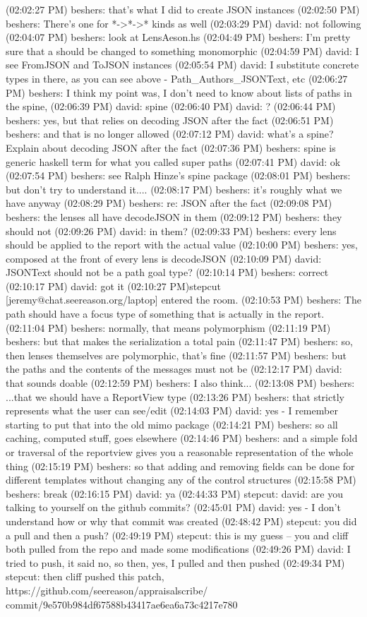 (02:02:27 PM) beshers: that's what I did to create JSON instances
(02:02:50 PM) beshers: There's one for *->*->* kinds as well
(02:03:29 PM) david: not following
(02:04:07 PM) beshers: look at LensAeson.hs
(02:04:49 PM) beshers: I'm pretty sure that a should be changed to something
monomorphic
(02:04:59 PM) david: I see FromJSON and ToJSON instances
(02:05:54 PM) david: I substitute concrete types in there, as you can see above
- Path_Authors_JSONText, etc
(02:06:27 PM) beshers: I think my point was, I don't need to know about lists
of paths in the spine,
(02:06:39 PM) david: spine
(02:06:40 PM) david: ?
(02:06:44 PM) beshers: yes, but that relies on decoding JSON after the fact
(02:06:51 PM) beshers: and that is no longer allowed
(02:07:12 PM) david: what's a spine? Explain about decoding JSON after the fact
(02:07:36 PM) beshers: spine is generic haskell term for what you called super
paths
(02:07:41 PM) david: ok
(02:07:54 PM) beshers: see Ralph Hinze's spine package
(02:08:01 PM) beshers: but don't try to understand it....
(02:08:17 PM) beshers: it's roughly what we have anyway
(02:08:29 PM) beshers: re: JSON after the fact
(02:09:08 PM) beshers: the lenses all have decodeJSON in them
(02:09:12 PM) beshers: they should not
(02:09:26 PM) david: in them?
(02:09:33 PM) beshers: every lens should be applied to the report with the
actual value
(02:10:00 PM) beshers: yes, composed at the front of every lens is decodeJSON
(02:10:09 PM) david: JSONText should not be a path goal type?
(02:10:14 PM) beshers: correct
(02:10:17 PM) david: got it
(02:10:27 PM)stepcut [jeremy@chat.seereason.org/laptop] entered the room.
(02:10:53 PM) beshers: The path should have a focus type of something that is
actually in the report.
(02:11:04 PM) beshers: normally, that means polymorphism
(02:11:19 PM) beshers: but that makes the serialization a total pain
(02:11:47 PM) beshers: so, then lenses themselves are polymorphic, that's fine
(02:11:57 PM) beshers: but the paths and the contents of the messages must not
be
(02:12:17 PM) david: that sounds doable
(02:12:59 PM) beshers: I also think...
(02:13:08 PM) beshers: ...that we should have a ReportView type
(02:13:26 PM) beshers: that strictly represents what the user can see/edit
(02:14:03 PM) david: yes - I remember starting to put that into the old mimo
package
(02:14:21 PM) beshers: so all caching, computed stuff, goes elsewhere
(02:14:46 PM) beshers: and a simple fold or traversal of the reportview gives
you a reasonable representation of the whole thing
(02:15:19 PM) beshers: so that adding and removing fields can be done for
different templates without changing any of the control structures
(02:15:58 PM) beshers: break
(02:16:15 PM) david: ya
(02:44:33 PM) stepcut: david: are you talking to yourself on the github
commits?
(02:45:01 PM) david: yes - I don't understand how or why that commit was
created
(02:48:42 PM) stepcut: you did a pull and then a push?
(02:49:19 PM) stepcut: this is my guess -- you and cliff both pulled from the
repo and made some modifications
(02:49:26 PM) david: I tried to push, it said no, so then, yes, I pulled and
then pushed
(02:49:34 PM) stepcut:
then cliff pushed this patch, https://github.com/seereason/appraisalscribe/
commit/9e570b984df67588b43417ae6ea6a73c4217e780


